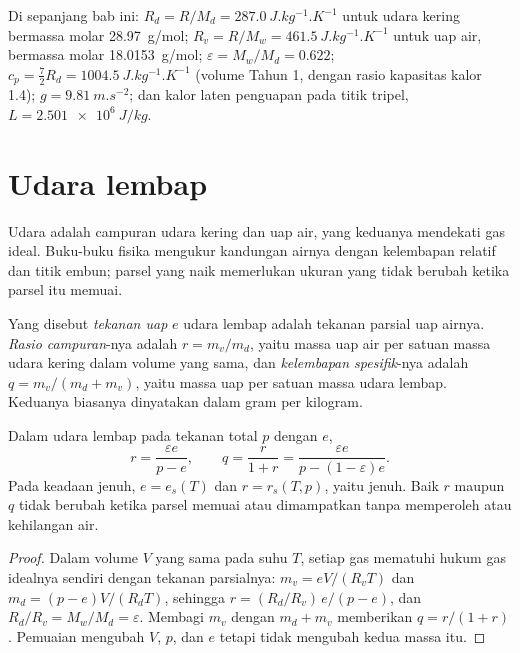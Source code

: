 Di sepanjang bab ini: $R_d = R/M_d = \qty{287.0}{J.kg^{-1}.K^{-1}}$ untuk udara kering bermassa molar
\qty{28.97}{g/mol}; $R_v = R/M_w = \qty{461.5}{J.kg^{-1}.K^{-1}}$ untuk uap air, bermassa
molar \qty{18.0153}{g/mol}; $\varepsilon = M_w/M_d = 0.622$; $c_p = \tfrac72 R_d =
\qty{1004.5}{J.kg^{-1}.K^{-1}}$ (volume Tahun 1, dengan rasio kapasitas kalor 1.4);
$g = \qty{9.81}{m.s^{-2}}$; dan kalor laten penguapan pada titik tripel,
$L = \qty{2.501e6}{J/kg}$.

\section{Udara lembap}\label{sec:b2:atmospheric-thermodynamics:moist-air}

Udara adalah campuran udara kering dan uap air, yang keduanya mendekati gas ideal. Buku-buku fisika
mengukur kandungan airnya dengan kelembapan relatif dan titik embun; parsel yang naik memerlukan ukuran
yang tidak berubah ketika parsel itu memuai.

\begin{definition}\label{def:b2:atmospheric-thermodynamics:moist-air}
Yang disebut \emph{tekanan uap} $e$ udara lembap adalah tekanan parsial
uap airnya. \emph{Rasio campuran}-nya adalah $r = m_v/m_d$, yaitu massa uap
air per satuan massa udara kering dalam volume yang sama, dan \emph{kelembapan spesifik}-nya
adalah $q = m_v/(m_d + m_v)$, yaitu massa uap per satuan massa
udara lembap. Keduanya biasanya dinyatakan dalam gram per kilogram.
\end{definition}

\begin{proposition}\label{prop:b2:atmospheric-thermodynamics:humidity}
Dalam udara lembap pada tekanan total $p$ dengan  $e$,
\[
  r = \frac{\varepsilon e}{p - e}, \qquad q = \frac{r}{1 + r} = \frac{\varepsilon e}{p - (1 -
  \varepsilon)e} .
\]
Pada keadaan jenuh, $e = e_s(T)$ dan $r = r_s(T, p)$, yaitu  jenuh. Baik $r$ maupun
$q$ tidak berubah ketika parsel memuai atau dimampatkan tanpa memperoleh atau kehilangan air.
\end{proposition}

\begin{proof}
Dalam volume $V$ yang sama pada suhu $T$, setiap gas mematuhi hukum gas idealnya sendiri dengan
tekanan parsialnya: $m_v = eV/(R_vT)$ dan $m_d = (p - e)V/(R_dT)$, sehingga $r = (R_d/R_v)\,e/(p - e)$,
dan $R_d/R_v = M_w/M_d = \varepsilon$. Membagi $m_v$ dengan $m_d + m_v$ memberikan $q = r/(1 + r)$.
Pemuaian mengubah $V$, $p$, dan $e$ tetapi tidak mengubah kedua massa itu.
\end{proof}

